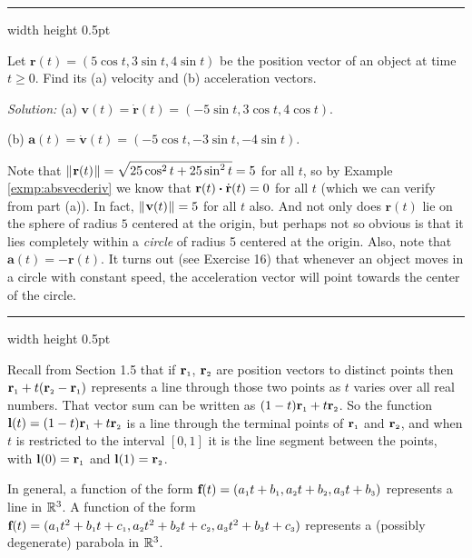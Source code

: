 \smallskip
\hrule width \textwidth height 0.5pt
\begin{exmp}
 Let $\textbf{r}(t) = (5 \cos t , 3 \sin t , 4 \sin t )$ be the position vector of an object at time $t \ge 0$. Find
 its (a) velocity and (b) acceleration vectors.
 \smallskip
 \par\noindent \emph{Solution:} (a) $\textbf{v}(t) = \dot{\textbf{r}}(t) = (-5 \sin t , 3 \cos t ,
 4 \cos t )$.
 \smallskip
 \par\noindent (b) $\textbf{a}(t) = \dot{\textbf{v}}(t) = (-5 \cos t , -3 \sin t , -4 \sin t )$.
 \smallskip
 
 \par\noindent Note that $\lVert\mspace{1mu}\textbf{r}(t)\mspace{1mu}\rVert = \sqrt{25 \cos^2 t + 25 \sin^2 t} = 5$ for all $t$, so by Example
 \ref{exmp:absvecderiv} we know that $\textbf{r}(t) \bm{\cdot} \dot{\textbf{r}}(t) = 0$ for all $t$ (which we can verify
 from part (a)). In fact, $\lVert\mspace{1mu}\textbf{v}(t)\mspace{1mu}\rVert = 5$ for all $t$ also. And not only does $\textbf{r}(t)$ lie on the
 sphere of radius $5$ centered at the origin, but perhaps not so obvious is that it lies completely within a
 \emph{circle} of radius 5 centered at the origin. Also, note that $\textbf{a}(t) = -\textbf{r}(t)$. It turns out (see
 Exercise 16) that whenever an object moves in a circle with constant speed, the acceleration vector will point towards the center of the circle.
\end{exmp}
\hrule width \textwidth height 0.5pt
\vskip3mm

Recall from Section 1.5 that if $\textbf{r}_{\scriptscriptstyle 1}$, $\textbf{r}_{\scriptscriptstyle 2}$ are position vectors to distinct points
then $\textbf{r}_{\scriptscriptstyle 1} + t (\textbf{r}_{\scriptscriptstyle 2} - \textbf{r}_{\scriptscriptstyle 1})$ represents a line through those two
points as $t$ varies over all real numbers. That vector sum can be written as $(1 - t) \textbf{r}_{\scriptscriptstyle 1} +
t \textbf{r}_{\scriptscriptstyle 2}$. So the function $\textbf{l}(t) = (1 - t) \textbf{r}_{\scriptscriptstyle 1} +
t \textbf{r}_{\scriptscriptstyle 2}$ is a line through the terminal points of $\textbf{r}_{\scriptscriptstyle 1}$ and $\textbf{r}_{\scriptscriptstyle 2}$, and
when $t$ is restricted to the interval $\left[ 0,1 \right]$ it is the line segment between the points, with
$\textbf{l}(0) = \textbf{r}_{\scriptscriptstyle 1}$ and $\textbf{l}(1) = \textbf{r}_{\scriptscriptstyle 2}$.

In general, a function of the form
$\textbf{f}(t) = (a_{\scriptscriptstyle 1}t + b_{\scriptscriptstyle 1},a_{\scriptscriptstyle 2}t + b_{\scriptscriptstyle 2},a_{\scriptscriptstyle 3}t + b_{\scriptscriptstyle 3})$ represents a line
in $\mathbb{R}^{3}$. A function of the form
$\textbf{f}(t) = (a_{\scriptscriptstyle 1}t^2 + b_{\scriptscriptstyle 1}t + c_{\scriptscriptstyle 1},a_{\scriptscriptstyle 2}t^2 + b_{\scriptscriptstyle 2}t + c_{\scriptscriptstyle 2},
a_{\scriptscriptstyle 3}t^2 + b_{\scriptscriptstyle 3}t + c_{\scriptscriptstyle 3})$ represents a (possibly degenerate) parabola in $\mathbb{R}^{3}$.

